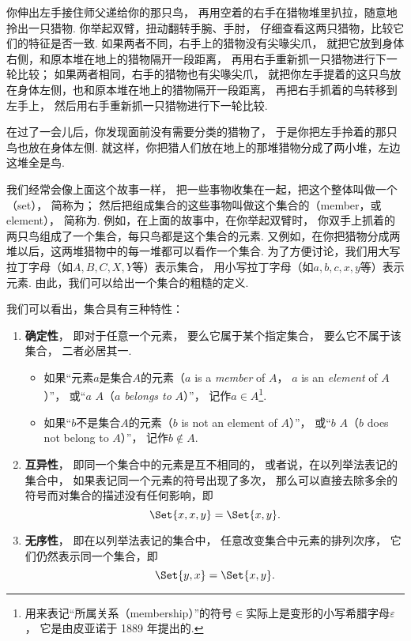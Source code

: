 你伸出左手接住师父递给你的那只鸟，
再用空着的右手在猎物堆里扒拉，随意地拎出一只猎物.
你举起双臂，扭动翻转手腕、手肘，
仔细查看这两只猎物，比较它们的特征是否一致.
如果两者不同，右手上的猎物没有尖喙尖爪，
就把它放到身体右侧，和原本堆在地上的猎物隔开一段距离，
再用右手重新抓一只猎物进行下一轮比较；
如果两者相同，右手的猎物也有尖喙尖爪，
就把你左手提着的这只鸟放在身体左侧，也和原本堆在地上的猎物隔开一段距离，
再把右手抓着的鸟转移到左手上，
然后用右手重新抓一只猎物进行下一轮比较.

在过了一会儿后，你发现面前没有需要分类的猎物了，
于是你把左手拎着的那只鸟也放在身体左侧.
就这样，你把猎人们放在地上的那堆猎物分成了两小堆，左边这堆全是鸟.


我们经常会像上面这个故事一样，
把一些事物收集在一起，把这个整体叫做一个（set），
简称为；
然后把组成集合的这些事物叫做这个集合的（member，或element），
简称为.
例如，在上面的故事中，在你举起双臂时，
你双手上抓着的两只鸟组成了一个集合，每只鸟都是这个集合的元素.
又例如，在你把猎物分成两堆以后，这两堆猎物中的每一堆都可以看作一个集合.
为了方便讨论，我们用大写拉丁字母（如\(A,B,C,X,Y\)等）表示集合，
用小写拉丁字母（如\(a,b,c,x,y\)等）表示元素.
由此，我们可以给出一个集合的粗糙的定义.

我们可以看出，集合具有三种特性：
\begin{enumerate}
	\item {\bf 确定性}，
	即对于任意一个元素，
	要么它属于某个指定集合，
	要么它不属于该集合，
	二者必居其一.
	\begin{itemize}
		\item 如果“元素\(a\)是集合\(A\)的元素（\(a\) is a \emph{member} of \(A\)，
		\(a\) is an \emph{element} of \(A\)）”，
		或“\(a\) \(A\)（\(a\) \emph{belongs to} \(A\)）”，
		记作\(a \in A\)\footnote{%
		用来表记“所属关系（membership）”的符号\(\in\)实际上是变形的小写希腊字母\(\varepsilon\)，%
		它是由皮亚诺于 1889 年提出的.}.

		\item 如果“\(b\)不是集合\(A\)的元素（\(b\) is not an element of \(A\)）”，%
		或“\(b\) \(A\)（\(b\) does not belong to \(A\)）”，%
		记作\(b \notin A\).
	\end{itemize}

	\item {\bf 互异性}，
	即同一个集合中的元素是互不相同的，
	或者说，在以列举法表记的集合中，
	如果表记同一个元素的符号出现了多次，
	那么可以直接去除多余的符号而对集合的描述没有任何影响，即\[
		\Set{ x, x, y } = \Set{ x, y }.
	\]

	\item {\bf 无序性}，
	即在以列举法表记的集合中，
	任意改变集合中元素的排列次序，
	它们仍然表示同一个集合，即\[
		\Set{ y, x } = \Set{ x, y }.
	\]
\end{enumerate}



